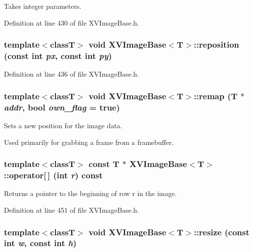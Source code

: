 Takes integer parameters. 

Definition at line 430 of file XVImage\-Base.h.\label{XVImageBase_a9}
\hypertarget{class_XVImageBase_a9}{
\subsubsection[reposition]{\setlength{\rightskip}{0pt plus 5cm}template$<$classT$>$ void XVImage\-Base$<$T$>$::reposition (const int {\em px}, const int {\em py})}}




Definition at line 436 of file XVImage\-Base.h.\label{XVImageBase_a10}
\hypertarget{class_XVImageBase_a10}{
\subsubsection[remap]{\setlength{\rightskip}{0pt plus 5cm}template$<$classT$>$ void XVImage\-Base$<$T$>$::remap (T $\ast$ {\em addr}, bool {\em own\_\-flag} = true)}}


Sets a new position for the image data.

Used primarily for grabbing a frame from a framebuffer. \label{XVImageBase_a11}
\hypertarget{class_XVImageBase_a11}{
\subsubsection[operator{}]{\setlength{\rightskip}{0pt plus 5cm}template$<$classT$>$ const T $\ast$ XVImage\-Base$<$T$>$::operator\mbox{[}$\,$\mbox{]} (int {\em r}) const}}


Returns a pointer to the beginning of row r in the image.



Definition at line 451 of file XVImage\-Base.h.\label{XVImageBase_a12}
\hypertarget{class_XVImageBase_a12}{
\subsubsection[resize]{\setlength{\rightskip}{0pt plus 5cm}template$<$classT$>$ void XVImage\-Base$<$T$>$::resize (const int {\em w}, const int {\em h})}}



